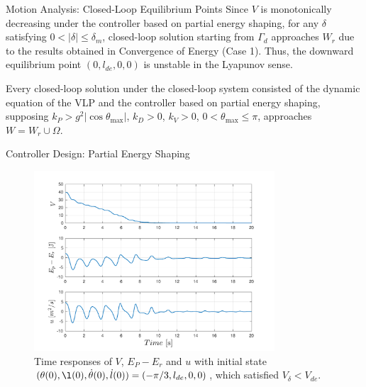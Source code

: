 \documentclass[10pt]{beamer}
\begin{document}
  \begin{frame}{Motion Analysis: Closed-Loop Equilibrium Points}
    Since $V$ is
    monotonically decreasing under the controller
    based on partial energy shaping, for any $\delta$
    satisfying $0 < |\delta| \le \delta_m$, closed-loop solution
    starting from $\Gamma_d$
    approaches $W_r$ due to the results obtained in
    Convergence of Energy (Case 1).
    Thus, the downward
    equilibrium point $(0, l_{de}, 0, 0)$ is unstable in the
    Lyapunov sense.

    Every closed-loop solution under the closed-loop
    system consisted of the dynamic equation of the VLP and the controller
    based on partial energy shaping, supposing
    $k_P>g^2|\cos\theta_{\max}|$, $k_D>0$, $k_V>0$,
    $0<\theta_{\max}\le\pi$, approaches $W=W_r\cup\Omega$.
  \end{frame}

  \begin{frame}{Controller Design: Partial Energy Shaping}
    \begin{figure}
      \caption{Time responses of $V$, $E_P-E_r$ and $u$ with initial state 
        $(\theta(0), \l(0), \dot{\theta}(0), \dot{l}(0))=(-\pi/3, l_{de}, 0,
        0)$, which satisfied $V_\delta < V_{de}$.}
      \vspace{-0.3cm}
      \includegraphics[width=0.8\textwidth]{images/partial_1b.pdf}
    \end{figure}
  \end{frame}
\end{document}
